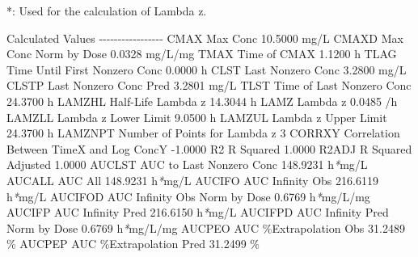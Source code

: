 \documentclass[
  11pt,
  krantz2, a4paper, twoside]{krantz}
\newenvironment{Shaded}{\begin{snugshade}}{\end{snugshade}}
\newcommand{\AttributeTok}[1]{\textcolor[rgb]{0.13,0.29,0.53}{#1}}
\newcommand{\ExtensionTok}[1]{#1}
\newcommand{\NormalTok}[1]{#1}
\newcommand{\PreprocessorTok}[1]{\textcolor[rgb]{0.56,0.35,0.01}{\textit{#1}}}
\theoremstyle{definition}
\theoremstyle{definition}
\theoremstyle{definition}
\theoremstyle{definition}
\theoremstyle{remark}
\begin{document}
\begin{Shaded}
\begin{Highlighting}[]
\ExtensionTok{*:}\NormalTok{ Used for the calculation of Lambda z.}


\ExtensionTok{Calculated}\NormalTok{ Values}
\ExtensionTok{{-}{-}{-}{-}{-}{-}{-}{-}{-}{-}{-}{-}{-}{-}{-}{-}{-}}
\ExtensionTok{CMAX}\NormalTok{       Max Conc                                       10.5000 mg/L}
\ExtensionTok{CMAXD}\NormalTok{      Max Conc Norm by Dose                           0.0328 mg/L/mg}
\ExtensionTok{TMAX}\NormalTok{       Time of CMAX                                    1.1200 h}
\ExtensionTok{TLAG}\NormalTok{       Time Until First Nonzero Conc                   0.0000 h}
\ExtensionTok{CLST}\NormalTok{       Last Nonzero Conc                               3.2800 mg/L}
\ExtensionTok{CLSTP}\NormalTok{      Last Nonzero Conc Pred                          3.2801 mg/L}
\ExtensionTok{TLST}\NormalTok{       Time of Last Nonzero Conc                      24.3700 h}
\ExtensionTok{LAMZHL}\NormalTok{     Half{-}Life Lambda z                             14.3044 h}
\ExtensionTok{LAMZ}\NormalTok{       Lambda z                                        0.0485 /h}
\ExtensionTok{LAMZLL}\NormalTok{     Lambda z Lower Limit                            9.0500 h}
\ExtensionTok{LAMZUL}\NormalTok{     Lambda z Upper Limit                           24.3700 h}
\ExtensionTok{LAMZNPT}\NormalTok{    Number of Points for Lambda z                   3}
\ExtensionTok{CORRXY}\NormalTok{     Correlation Between TimeX and Log ConcY        }\AttributeTok{{-}1.0000} 
\ExtensionTok{R2}\NormalTok{         R Squared                                       1.0000 }
\ExtensionTok{R2ADJ}\NormalTok{      R Squared Adjusted                              1.0000 }
\ExtensionTok{AUCLST}\NormalTok{     AUC to Last Nonzero Conc                      148.9231 h}\PreprocessorTok{*}\NormalTok{mg/L}
\ExtensionTok{AUCALL}\NormalTok{     AUC All                                       148.9231 h}\PreprocessorTok{*}\NormalTok{mg/L}
\ExtensionTok{AUCIFO}\NormalTok{     AUC Infinity Obs                              216.6119 h}\PreprocessorTok{*}\NormalTok{mg/L}
\ExtensionTok{AUCIFOD}\NormalTok{    AUC Infinity Obs Norm by Dose                   0.6769 h}\PreprocessorTok{*}\NormalTok{mg/L/mg}
\ExtensionTok{AUCIFP}\NormalTok{     AUC Infinity Pred                             216.6150 h}\PreprocessorTok{*}\NormalTok{mg/L}
\ExtensionTok{AUCIFPD}\NormalTok{    AUC Infinity Pred Norm by Dose                  0.6769 h}\PreprocessorTok{*}\NormalTok{mg/L/mg}
\ExtensionTok{AUCPEO}\NormalTok{     AUC \%Extrapolation Obs                         31.2489 \%}
\ExtensionTok{AUCPEP}\NormalTok{     AUC \%Extrapolation Pred                        31.2499 \%}

\end{Highlighting}
\end{Shaded}
\end{document}
